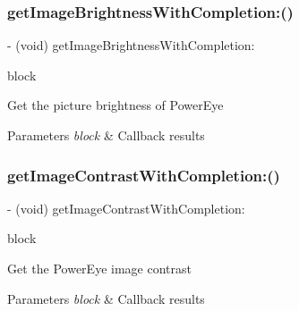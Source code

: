 \subsubsection{\texorpdfstring{get\+Image\+Brightness\+With\+Completion\+:()}{getImageBrightnessWithCompletion:()}}
{\footnotesize\ttfamily -\/ (void) get\+Image\+Brightness\+With\+Completion\+: \begin{DoxyParamCaption}\item[{(void($^\wedge$)(N\+S\+Integer brightness, N\+S\+Error $\ast$\hyperlink{group___p_v_s_d_k___c_o_r_e___a_p_i___m_o_u_n_t_c_o_n_t_r_o_l_ga5a1de33b230662127568783314b4a54d}{\+\_\+\+Nullable} error))}]{block }\end{DoxyParamCaption}}

Get the picture brightness of Power\+Eye


\begin{DoxyParams}{Parameters}
{\em block} & Callback results \\
\hline
\end{DoxyParams}
\mbox{\label{interface_p_v_camera_a9899f3f0aed287bf70aea47cb6b83f7a}} 
\subsubsection{\texorpdfstring{get\+Image\+Contrast\+With\+Completion\+:()}{getImageContrastWithCompletion:()}}
{\footnotesize\ttfamily -\/ (void) get\+Image\+Contrast\+With\+Completion\+: \begin{DoxyParamCaption}\item[{(void($^\wedge$)(N\+S\+Integer contrast, N\+S\+Error $\ast$\hyperlink{group___p_v_s_d_k___c_o_r_e___a_p_i___m_o_u_n_t_c_o_n_t_r_o_l_ga5a1de33b230662127568783314b4a54d}{\+\_\+\+Nullable} error))}]{block }\end{DoxyParamCaption}}

Get the Power\+Eye image contrast


\begin{DoxyParams}{Parameters}
{\em block} & Callback results \\
\hline
\end{DoxyParams}
\mbox{\label{interface_p_v_camera_aaf8754475a0f68f3a12c83df9b5bdbc8}} 
